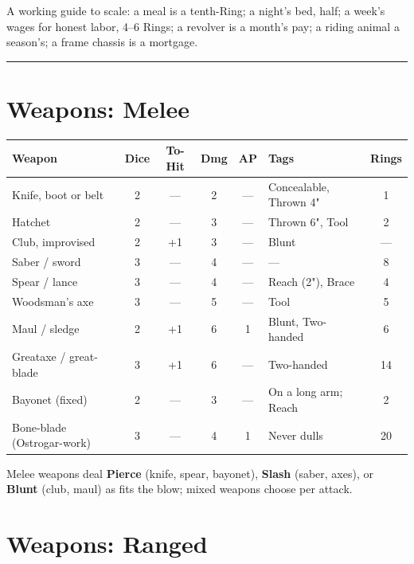 A working guide to scale: a meal is a tenth-Ring; a night's bed, half; a week's wages for honest labor, 4--6 Rings; a revolver is a month's pay; a riding animal a season's; a frame chassis is a mortgage.

\medskip\hrule\medskip

\section{Weapons: Melee}

\begin{center}
\small
\begin{tabular}{l|c|c|c|c|l|c}
\textbf{Weapon} & \textbf{Dice} & \textbf{To-Hit} & \textbf{Dmg} & \textbf{AP} & \textbf{Tags} & \textbf{Rings} \\
\hline
Knife, boot or belt & 2 & --- & 2 & --- & Concealable, Thrown 4" & 1 \\
Hatchet & 2 & --- & 3 & --- & Thrown 6", Tool & 2 \\
Club, improvised & 2 & +1 & 3 & --- & Blunt & --- \\
Saber / sword & 3 & --- & 4 & --- & --- & 8 \\
Spear / lance & 3 & --- & 4 & --- & Reach (2"), Brace & 4 \\
Woodsman's axe & 3 & --- & 5 & --- & Tool & 5 \\
Maul / sledge & 2 & +1 & 6 & 1 & Blunt, Two-handed & 6 \\
Greataxe / great-blade & 3 & +1 & 6 & --- & Two-handed & 14 \\
Bayonet (fixed) & 2 & --- & 3 & --- & On a long arm; Reach & 2 \\
Bone-blade (Ostrogar-work) & 3 & --- & 4 & 1 & Never dulls & 20 \\
\end{tabular}
\end{center}

Melee weapons deal \textbf{Pierce} (knife, spear, bayonet), \textbf{Slash} (saber, axes), or \textbf{Blunt} (club, maul) as fits the blow; mixed weapons choose per attack.

\section{Weapons: Ranged}

